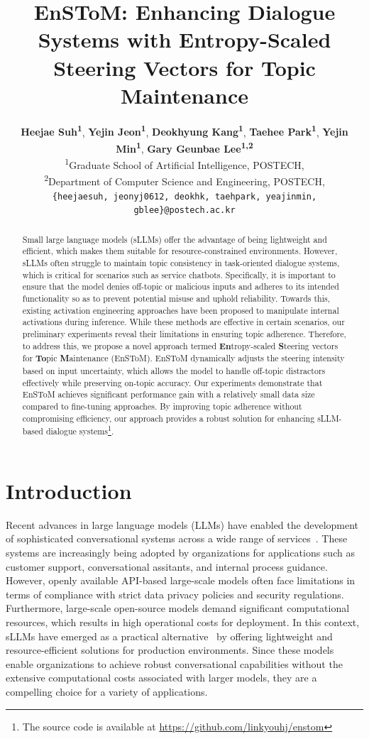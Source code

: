 \documentclass[11pt]{article}
\title{EnSToM: Enhancing Dialogue Systems with Entropy-Scaled Steering Vectors for Topic Maintenance}
\author{
 \textbf{Heejae Suh\textsuperscript{1}}, 
 \textbf{Yejin Jeon\textsuperscript{1}}, 
 \textbf{Deokhyung Kang\textsuperscript{1}}, 
 \textbf{Taehee Park\textsuperscript{1}}, 
 \textbf{Yejin Min\textsuperscript{1}}, 
 \textbf{Gary Geunbae Lee\textsuperscript{1,2}}
\\
 \textsuperscript{1}Graduate School of Artificial Intelligence, POSTECH,\\
 \textsuperscript{2}Department of Computer Science and Engineering, POSTECH,
\\
 \texttt{\{heejaesuh, jeonyj0612, deokhk, taehpark, yeajinmin, gblee\}@postech.ac.kr}\\
}
\begin{document}
\maketitle
\begin{abstract}
Small large language models (sLLMs) offer the advantage of being lightweight and efficient, which makes them suitable for resource-constrained environments. However, sLLMs often struggle to maintain topic consistency in task-oriented dialogue systems, which is critical for scenarios such as service chatbots. Specifically, it is important to ensure that the model denies off-topic or malicious inputs and adheres to its intended functionality so as to prevent potential misuse and uphold reliability. Towards this, existing activation engineering approaches have been proposed to manipulate internal activations during inference. While these methods are effective in certain scenarios, our preliminary experiments reveal their limitations in ensuring topic adherence. Therefore, to address this, we propose a novel approach termed \textbf{En}tropy-scaled \textbf{S}teering vectors for \textbf{To}pic \textbf{M}aintenance (EnSToM). EnSToM dynamically adjusts the steering intensity based on input uncertainty, which allows the model to handle off-topic distractors effectively while preserving on-topic accuracy. Our experiments demonstrate that EnSToM achieves significant performance gain with a relatively small data size compared to fine-tuning approaches. By improving topic adherence without compromising efficiency, our approach provides a robust solution for enhancing sLLM-based dialogue systems\footnote{The source code is available at \url{https://github.com/linkyouhj/enstom}}.

\end{abstract}

\section{Introduction}

Recent advances in large language models (LLMs) have enabled the development of sophisticated conversational systems across a wide range of services~\cite{naveed2024comprehensiveoverviewlargelanguage}. These systems are increasingly being adopted by organizations for applications such as customer support, conversational assitants, and internal process guidance. However, openly available API-based large-scale models often face limitations in terms of compliance with strict data privacy policies and security regulations. Furthermore, large-scale open-source models demand significant computational resources, which results in high operational costs for deployment. In this context, sLLMs have emerged as a practical alternative~\cite{10.1145/3589334.3645420} by offering lightweight and resource-efficient solutions for production environments. Since these models enable organizations to achieve robust conversational capabilities without the extensive computational costs associated with larger models, they are a compelling choice for a variety of applications.
\end{document}
